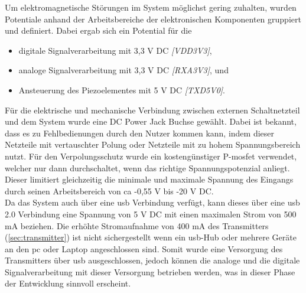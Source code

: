 Um elektromagnetische Störungen im System möglichst gering zuhalten, wurden Potentiale anhand der Arbeitsbereiche der elektronischen Komponenten gruppiert und definiert. Dabei ergab sich ein Potential für die 
\begin{itemize}\itemsep0pt
\item digitale Signalverarbeitung mit 3,3 V DC \textit{[VDD3V3]},
\item analoge Signalverarbeitung mit 3,3 V DC \textit{[RXA3V3]}, und
\item Ansteuerung des Piezoelementes mit 5 V DC \textit{[TXD5V0]}.
\end{itemize}
Für die elektrische und mechanische Verbindung zwischen externen Schaltnetzteil und dem System wurde eine DC Power Jack Buchse gewählt. Dabei ist bekannt, dass es zu Fehlbedienungen durch den Nutzer kommen kann, indem dieser Netzteile mit vertauschter Polung oder Netzteile mit zu hohem Spannungsbereich nutzt.
Für den Verpolungsschutz wurde ein kostengünstiger P-\ac{mosfet} verwendet, welcher nur dann durchschaltet, wenn das richtige Spannungspotenzial anliegt. Dieser limitiert gleichzeitig die minimale und maximale Spannung des Eingangs durch seinen Arbeitsbereich von \ac{ca} -0,55 V  bis -20 V DC.\\
Da das System auch über eine \ac{usb} Verbindung verfügt, kann dieses über eine \ac{usb} 2.0 Verbindung eine Spannung von 5 V DC mit einen maximalen Strom von 500 mA beziehen. Die erhöhte Stromaufnahme von 400 mA des Transmitters (\autoref{sec:transmitter}) ist nicht sichergestellt wenn ein \ac{usb}-Hub oder mehrere Geräte an den \ac{pc} oder Laptop angeschlossen sind. Somit wurde eine Versorgung des Transmitters über \ac{usb} ausgeschlossen, jedoch können die analoge und die digitale Signalverarbeitung mit dieser Versorgung betrieben werden, was in dieser Phase der Entwicklung sinnvoll erscheint.

